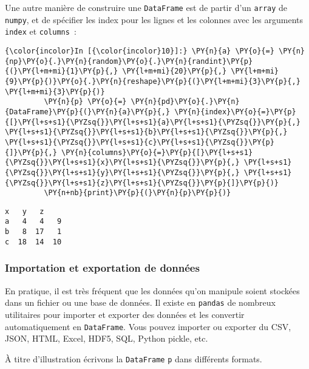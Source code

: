     Une autre manière de construire une \texttt{DataFrame} est de partir
d'un \texttt{array} de \texttt{numpy}, et de spécifier les index pour
les lignes et les colonnes avec les arguments \texttt{index} et
\texttt{columns}~:

    \begin{Verbatim}[commandchars=\\\{\},frame=single,framerule=0.3mm,rulecolor=\color{cellframecolor}]
{\color{incolor}In [{\color{incolor}10}]:} \PY{n}{a} \PY{o}{=} \PY{n}{np}\PY{o}{.}\PY{n}{random}\PY{o}{.}\PY{n}{randint}\PY{p}{(}\PY{l+m+mi}{1}\PY{p}{,} \PY{l+m+mi}{20}\PY{p}{,} \PY{l+m+mi}{9}\PY{p}{)}\PY{o}{.}\PY{n}{reshape}\PY{p}{(}\PY{l+m+mi}{3}\PY{p}{,} \PY{l+m+mi}{3}\PY{p}{)}
         \PY{n}{p} \PY{o}{=} \PY{n}{pd}\PY{o}{.}\PY{n}{DataFrame}\PY{p}{(}\PY{n}{a}\PY{p}{,} \PY{n}{index}\PY{o}{=}\PY{p}{[}\PY{l+s+s1}{\PYZsq{}}\PY{l+s+s1}{a}\PY{l+s+s1}{\PYZsq{}}\PY{p}{,} \PY{l+s+s1}{\PYZsq{}}\PY{l+s+s1}{b}\PY{l+s+s1}{\PYZsq{}}\PY{p}{,} \PY{l+s+s1}{\PYZsq{}}\PY{l+s+s1}{c}\PY{l+s+s1}{\PYZsq{}}\PY{p}{]}\PY{p}{,} \PY{n}{columns}\PY{o}{=}\PY{p}{[}\PY{l+s+s1}{\PYZsq{}}\PY{l+s+s1}{x}\PY{l+s+s1}{\PYZsq{}}\PY{p}{,} \PY{l+s+s1}{\PYZsq{}}\PY{l+s+s1}{y}\PY{l+s+s1}{\PYZsq{}}\PY{p}{,} \PY{l+s+s1}{\PYZsq{}}\PY{l+s+s1}{z}\PY{l+s+s1}{\PYZsq{}}\PY{p}{]}\PY{p}{)}
         \PY{n+nb}{print}\PY{p}{(}\PY{n}{p}\PY{p}{)}
\end{Verbatim}


    \begin{Verbatim}[commandchars=\\\{\},frame=single,framerule=0.3mm,rulecolor=\color{cellframecolor}]
    x   y   z
a   4   4   9
b   8  17   1
c  18  14  10
\end{Verbatim}

    \hypertarget{importation-et-exportation-de-donnuxe9es}{%
\subsubsection{Importation et exportation de
données}\label{importation-et-exportation-de-donnuxe9es}}

    En pratique, il est très fréquent que les données qu'on manipule soient
stockées dans un fichier ou une base de données. Il existe en
\texttt{pandas} de nombreux utilitaires pour importer et exporter des
données et les convertir automatiquement en \texttt{DataFrame}. Vous
pouvez importer ou exporter du CSV, JSON, HTML, Excel, HDF5, SQL, Python
pickle, etc.

    À titre d'illustration écrivons la \texttt{DataFrame} \texttt{p} dans
différents formats.

